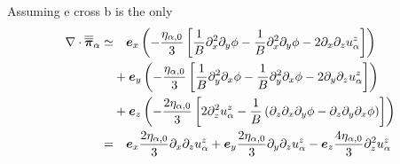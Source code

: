 %
Assuming e cross b is the only
%
\begin{align*}
    \nabla\cdot\boldsymbol{\overline{\overline{\pi}}}_\alpha
    \simeq&
    \quad
    \boldsymbol{e}_x
    \left(
       -\frac{\eta_{\alpha,0}}{3}
                       \left[\frac{1}{B} \partial_x^2 \partial_y \phi
              - \frac{1}{B} \partial_x^2\partial_y \phi
              - 2\partial_x\partial_z u^{z}_{\alpha} \right]
    \right)
    \\&+
    \boldsymbol{e}_y
    \left(
     -\frac{\eta_{\alpha,0}}{3}
                       \left[\frac{1}{B} \partial_y^2\partial_x \phi
              - \frac{1}{B} \partial_y^2 \partial_x \phi
              - 2\partial_y\partial_z u^{z}_{\alpha} \right]
    \right)
    \\&+
    \boldsymbol{e}_z
    \left(
    -\frac{2\eta_{\alpha,0}}{3}
        \left[
        2\partial_z^2 u^{z}_{\alpha} -
        \frac{1}{B} \left(\partial_z\partial_x \partial_y \phi
           -\partial_z\partial_y \partial_x \phi
        \right)
        \right]
    \right)
    \\
    =&
    \quad
    \boldsymbol{e}_x \frac{2\eta_{\alpha,0}}{3} \partial_x\partial_z u^{z}_{\alpha}
    +
    \boldsymbol{e}_y \frac{2\eta_{\alpha,0}}{3} \partial_y\partial_z u^{z}_{\alpha}
    -
    \boldsymbol{e}_z
    \frac{4\eta_{\alpha,0}}{3} \partial_z^2 u^{z}_{\alpha}
\end{align*}
%






